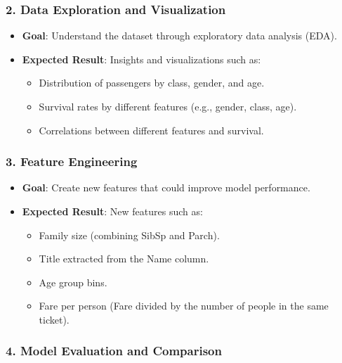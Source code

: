 \documentclass[
]{article}
\providecommand{\tightlist}{%
  \setlength{\itemsep}{0pt}\setlength{\parskip}{0pt}}
\begin{document}
\hypertarget{data-exploration-and-visualization}{%
\subsubsection{2. Data Exploration and
Visualization}\label{data-exploration-and-visualization}}

\begin{itemize}
\tightlist
\item
  \textbf{Goal}: Understand the dataset through exploratory data
  analysis (EDA).
\item
  \textbf{Expected Result}: Insights and visualizations such as:

  \begin{itemize}
  \tightlist
  \item
    Distribution of passengers by class, gender, and age.
  \item
    Survival rates by different features (e.g., gender, class, age).
  \item
    Correlations between different features and survival.
  \end{itemize}
\end{itemize}

\hypertarget{feature-engineering}{%
\subsubsection{3. Feature Engineering}\label{feature-engineering}}

\begin{itemize}
\tightlist
\item
  \textbf{Goal}: Create new features that could improve model
  performance.
\item
  \textbf{Expected Result}: New features such as:

  \begin{itemize}
  \tightlist
  \item
    Family size (combining SibSp and Parch).
  \item
    Title extracted from the Name column.
  \item
    Age group bins.
  \item
    Fare per person (Fare divided by the number of people in the same
    ticket).
  \end{itemize}
\end{itemize}

\hypertarget{model-evaluation-and-comparison}{%
\subsubsection{4. Model Evaluation and
Comparison}\label{model-evaluation-and-comparison}}
\end{document}
